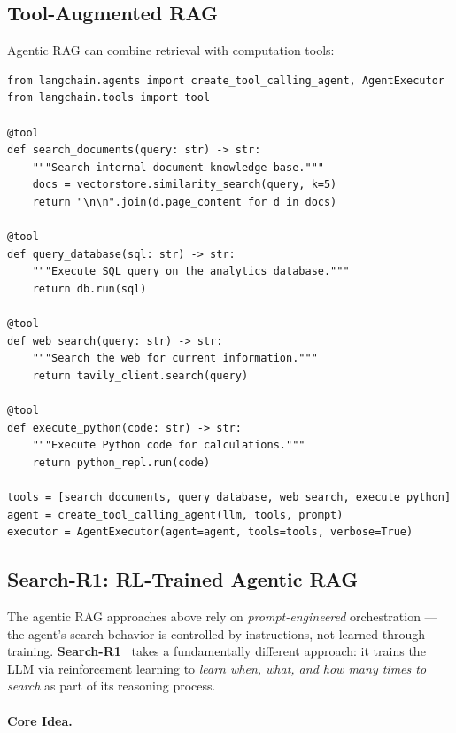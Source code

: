 \subsection{Tool-Augmented RAG}
\label{tool-augmented-rag}

Agentic RAG can combine retrieval with computation tools:

\begin{lstlisting}[style=pythonstyle, caption={Tool-augmented RAG with SQL and retrieval}]
from langchain.agents import create_tool_calling_agent, AgentExecutor
from langchain.tools import tool

@tool
def search_documents(query: str) -> str:
    """Search internal document knowledge base."""
    docs = vectorstore.similarity_search(query, k=5)
    return "\n\n".join(d.page_content for d in docs)

@tool
def query_database(sql: str) -> str:
    """Execute SQL query on the analytics database."""
    return db.run(sql)

@tool
def web_search(query: str) -> str:
    """Search the web for current information."""
    return tavily_client.search(query)

@tool
def execute_python(code: str) -> str:
    """Execute Python code for calculations."""
    return python_repl.run(code)

tools = [search_documents, query_database, web_search, execute_python]
agent = create_tool_calling_agent(llm, tools, prompt)
executor = AgentExecutor(agent=agent, tools=tools, verbose=True)
\end{lstlisting}

\subsection{Search-R1: RL-Trained Agentic RAG}
\label{search-r1-rl-trained-agentic-rag}

The agentic RAG approaches above rely on \emph{prompt-engineered} orchestration --- the agent’s search behavior is controlled by instructions, not learned through training. \textbf{Search-R1}~\cite{jin2025searchr1} takes a fundamentally different approach: it trains the LLM via reinforcement learning to \emph{learn when, what, and how many times to search} as part of its reasoning process.

\paragraph{Core Idea.}
\label{core-idea.}

